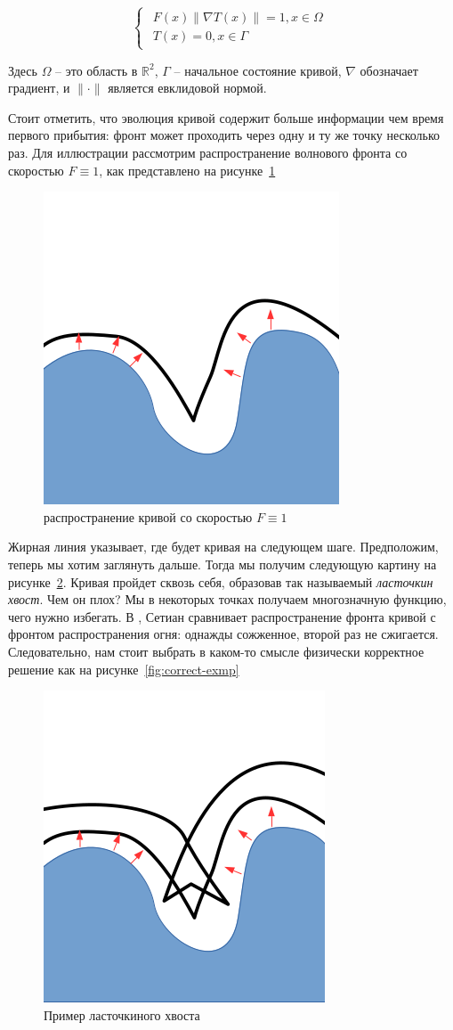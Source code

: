\begin{equation}
  \label{eq:eikonal}
  \begin{cases}
    \begin{array}{ll}
      F(x) \| \nabla T(x) \| = 1, x \in \Omega \\
      T(x) = 0, x \in \Gamma
    \end{array}
  \end{cases}
\end{equation}

Здесь $\Omega$ -- это область в $\mathbb{R}^2$, $\Gamma$ -- начальное
состояние кривой, $\nabla$ обозначает градиент, и $\| \cdot \|$ является
евклидовой нормой.

Стоит отметить, что эволюция кривой содержит больше информации чем
время первого прибытия: фронт может проходить через одну и ту же точку
несколько раз. Для иллюстрации рассмотрим распространение
волнового фронта со скоростью $F \equiv 1$, как представлено на
рисунке~\ref{fig:prpgt-eik}

\begin{figure}[h]
  \centering
  \includegraphics[width=0.3\linewidth]{img/propagate_eikonal.png}
  \hfil \caption{распространение кривой со скоростью $F \equiv 1$}
  \label{fig:prpgt-eik}

\end{figure}

Жирная линия указывает, где будет кривая на следующем шаге.
Предположим, теперь мы хотим заглянуть дальше. Тогда мы получим
следующую картину на рисунке~\ref{fig:swallow-ex}. Кривая пройдет
сквозь себя, образовав так называемый \textit{ласточкин хвост}. Чем он
плох? Мы в некоторых точках получаем многозначную функцию, чего нужно
избегать. В \cite{S1999}, Сетиан сравнивает распространение фронта
кривой с фронтом распространения огня: однажды сожженное, второй раз
не сжигается. Следовательно, нам стоит выбрать в каком-то смысле
физически корректное решение как на рисунке~\ref{fig:correct-exmp}

\begin{figure}[h]
  \centering
  \includegraphics[width=0.3\linewidth]{img/swallow-tail-example.png}
  \hfil \caption{Пример ласточкиного хвоста}
  \label{fig:swallow-ex}

\end{figure}

